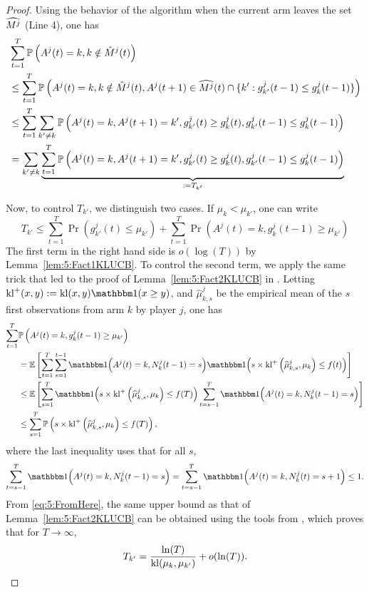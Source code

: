 \begin{proof}
  Using the behavior of the algorithm when the current arm leaves the set $\widehat{M^j}$ (Line 4), one has
  \begin{align*}
    & \sum_{t=1}^T \mathbb{P}\left(A^j(t) = k, k \notin \hat{M}^j(t)\right)  \\ & \leq \sum_{t=1}^T \mathbb{P}\left(A^j(t) = k, k \notin \hat{M}^j(t), A^j(t+1) \in \widehat{M^j}(t) \cap \{k': g_{k'}^j(t-1) \leq g_k^j(t-1)\}\right) \\
    & \leq   \sum_{t=1}^T \sum_{k' \neq k}\mathbb{P}\left(A^j(t) = k,A^j(t+1) = k', g_{k'}^j(t) \geq g_{k}^j(t), g_{k'}^j(t-1) \leq g_{k}^j(t-1)  \right) \\
    & = \sum_{k' \neq k} \underbrace{\sum_{t=1}^T \mathbb{P}\left(A^j(t) = k,A^j(t+1) = k', g_{k'}^j(t) \geq g_{k}^j(t), g_{k'}^j(t-1) \leq g_{k}^j(t-1)  \right)}_{:= T_{k'}}
  \end{align*}

  Now, to control $T_{k'}$, we distinguish two cases. If $\mu_k < \mu_{k'}$, one can write
  \[T_{k'} \leq \sum_{t=1}^T \Pr\left(g_{k'}^j(t) \leq \mu_{k'}\right) + \sum_{t=1}^T \Pr\left(A^j(t) = k, g_{k}^j(t-1) \geq \mu_{k'}\right)\]
  The first term in the right hand side is $o(\log(T))$ by Lemma~\ref{lem:5:Fact1KLUCB}. To control the second term, we apply the same trick that led to the proof of Lemma~\ref{lem:5:Fact2KLUCB} in \cite{KLUCBJournal}.
  Letting $\kl^+(x, y) := \kl(x, y) \indic(x \geq y)$,
  and $\widehat{\mu}^j_{k,s}$ be the empirical mean of the $s$ first observations from arm $k$ by player $j$, one has
  \begin{align}
    \sum_{t=1}^T & \Pr\left(A^j(t) = k, g_{k}^j(t-1) \geq \mu_{k'}\right) \nonumber\\
    & =  \bE \left[ \sum_{t=1}^T\sum_{s=1}^{t-1} \indic{\left(A^j(t) = k , N^j_k(t-1) = s\right)}\indic{\left( s  \times \kl^+\left(\widehat{\mu}_{k,s}^j , \mu_k\right) \leq f(t)\right)} \right]\nonumber\\
    & \leq \bE \left[ \sum_{s=1}^{T}\indic{\left( s \times \kl^+\left(\widehat{\mu}_{k,s}^j , \mu_k\right) \leq f(T)\right)}\sum_{t=s-1}^T \indic{\left(A^j(t) = k , N^j_k(t-1) = s\right)} \right] \nonumber \\
    & \leq \sum_{s=1}^T \Pr\left( s \times \kl^+\left(\widehat{\mu}_{k,s}^j , \mu_k\right) \leq f(T)\right),\label{eq:5:FromHere}
  \end{align}
  where the last inequality uses that for all $s$, \[\sum_{t=s-1}^T \indic{\left(A^j(t) = k , N^j_k(t-1) = s\right)} = \sum_{t=s-1}^T \indic{\left(A^j(t) = k , N^j_k(t) = s + 1\right)} \leq 1.\]
  From \eqref{eq:5:FromHere}, the same upper bound as that of Lemma~\ref{lem:5:Fact2KLUCB} can be obtained using the tools from \cite{KLUCBJournal}, which proves that for $T\to\infty$,
  \[T_{k'} = \frac{\ln(T)}{\mathrm{kl}(\mu_k,\mu_{k'})} + o(\ln(T)).\]


\end{proof}
